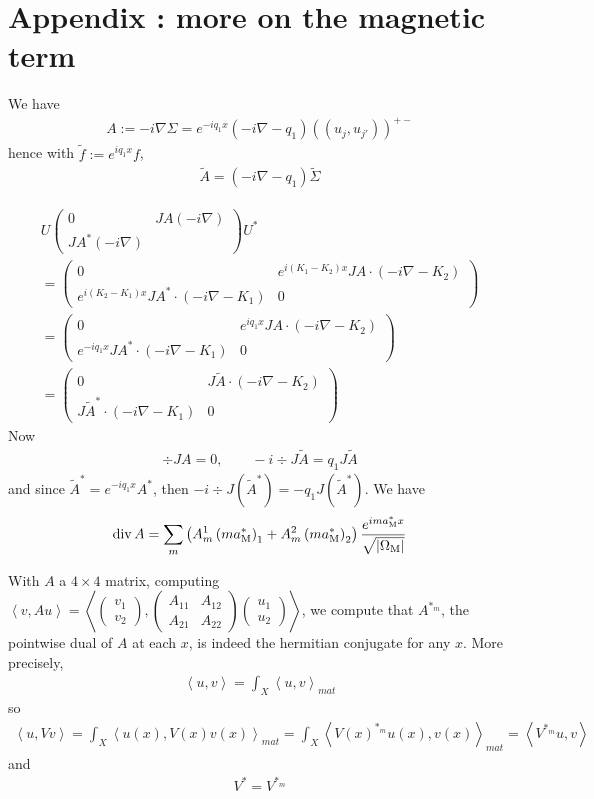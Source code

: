 \documentclass[11pt,a4paper,reqno,french,tikz]{amsart}
\newcommand{\pa}[1]{\left( #1 \right)} %
\newcommand{\ab}[1]{\left|#1\right|} %
\newcommand{\ps}[1]{\left< #1 \right>} %
\newcommand{\na}{\nabla} %
\newcommand{\f}[2]{\frac{#1}{#2}} %
\newcommand{\ind}[1]{_{\textup{#1}}} %
\newcommand{\mat}[1]{\begin{pmatrix} #1 \end{pmatrix}} %
\newcommand{\db}[1]{\left(\!\left( #1 \right)\!\right)}
\newcommand{\sqom}{\sqrt{\ab{\Omega\ind{M}}}}
\begin{document}
\section{Appendix : more on the magnetic term}%
\label{sec:Appendix : more on the magnetic term}

We have
\begin{align*}
A := -i\na \Sigma = e^{-iq_1 x} \pa{-i\na - q_1} \db{u_j,u_{j'}}^{+-}
\end{align*}
hence with $\widetilde{f} := e^{iq_1 x} f$,
\begin{align*}
\widetilde{A} = \pa{-i\na - q_1} \widetilde{\Sigma}
\end{align*}

\begin{multline*}
	U \mat{0 & JA (-i\na) \\ JA^* (-i\na)} U^* \\
	= \mat{0 & e^{i( K_1 - K_2)x} JA \cdot(-i\na - K_2) \\ e^{i(K_2 -  K_1)x} JA^* \cdot(-i\na -  K_1) & 0} \\
	= \mat{0 & e^{iq_1 x} JA \cdot(-i\na - K_2) \\ e^{-iq_1 x} JA^* \cdot(-i\na -  K_1) & 0} \\
	= \mat{0 & J \widetilde{A} \cdot(-i\na - K_2) \\  J\widetilde{A}^* \cdot(-i\na -  K_1) & 0}
\end{multline*}
Now
\begin{align*}
\div JA = 0,\qquad -i\div J \widetilde{A} = q_1 J \widetilde{A}
\end{align*}
and since $\widetilde{A}^* = e^{-iq_1 x} A^*$, then $-i\div J \pa{\widetilde{A}^*} = -q_1 J  \pa{\widetilde{A}^*}$. We have
\begin{align*}
\div A = \sum_m \pa{A_m^1 \pa{m  a\ind{M}^*}_1 + A_m^2 \pa{m  a\ind{M}^*}_2} \f{e^{im a\ind{M}^*x}}{\sqom}
\end{align*}

With $A$ a $4 \times 4$ matrix, computing $\ps{v, A u} = \ps{\mat{v_1 \\ v_2},\mat{A_{11} & A_{12} \\ A_{21} & A_{22}} \mat{u_1\\u_2}}$, we compute that $A^{*_m}$, the pointwise dual of $A$ at each $x$, is indeed the hermitian conjugate for any $x$. More precisely,
\begin{align*}
\ps{u,v} = \int_X \ps{u,v}_{mat}
\end{align*}
so
\begin{align*}
\ps{u,V v} = \int_X \ps{u(x),V(x) v(x)}_{mat} = \int_X \ps{V(x)^{*_m} u(x),v(x)}_{mat} = \ps{V^{*_m} u,v}
\end{align*}
and
\begin{align*}
\boxed{V^* = V^{*_m}}
\end{align*}
\end{document}
